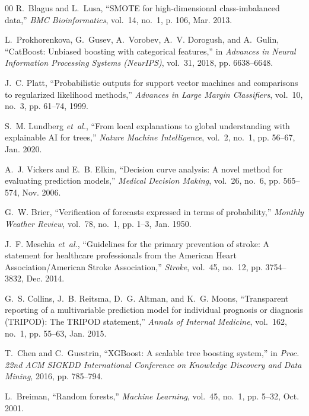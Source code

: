 \documentclass[conference]{IEEEtran}
\begin{document}
\begin{thebibliography}{00}
R.~Blagus and L.~Lusa, ``SMOTE for high-dimensional class-imbalanced data,'' \emph{BMC Bioinformatics}, vol.~14, no.~1, p. 106, Mar. 2013.

L.~Prokhorenkova, G.~Gusev, A.~Vorobev, A.~V. Dorogush, and A.~Gulin, ``CatBoost: Unbiased boosting with categorical features,'' in \emph{Advances in Neural Information Processing Systems (NeurIPS)}, vol.~31, 2018, pp. 6638--6648.

J.~C. Platt, ``Probabilistic outputs for support vector machines and comparisons to regularized likelihood methods,'' \emph{Advances in Large Margin Classifiers}, vol.~10, no.~3, pp. 61--74, 1999.

S.~M. Lundberg \emph{et~al.}, ``From local explanations to global understanding with explainable AI for trees,'' \emph{Nature Machine Intelligence}, vol.~2, no.~1, pp. 56--67, Jan. 2020.

A.~J. Vickers and E.~B. Elkin, ``Decision curve analysis: A novel method for evaluating prediction models,'' \emph{Medical Decision Making}, vol.~26, no.~6, pp. 565--574, Nov. 2006.

G.~W. Brier, ``Verification of forecasts expressed in terms of probability,'' \emph{Monthly Weather Review}, vol.~78, no.~1, pp. 1--3, Jan. 1950.

J.~F. Meschia \emph{et~al.}, ``Guidelines for the primary prevention of stroke: A statement for healthcare professionals from the American Heart Association/American Stroke Association,'' \emph{Stroke}, vol.~45, no.~12, pp. 3754--3832, Dec. 2014.

G.~S. Collins, J.~B. Reitsma, D.~G. Altman, and K.~G. Moons, ``Transparent reporting of a multivariable prediction model for individual prognosis or diagnosis (TRIPOD): The TRIPOD statement,'' \emph{Annals of Internal Medicine}, vol.~162, no.~1, pp. 55--63, Jan. 2015.

T.~Chen and C.~Guestrin, ``XGBoost: A scalable tree boosting system,'' in \emph{Proc. 22nd ACM SIGKDD International Conference on Knowledge Discovery and Data Mining}, 2016, pp. 785--794.

L.~Breiman, ``Random forests,'' \emph{Machine Learning}, vol.~45, no.~1, pp. 5--32, Oct. 2001.

\end{thebibliography}
\end{document}
